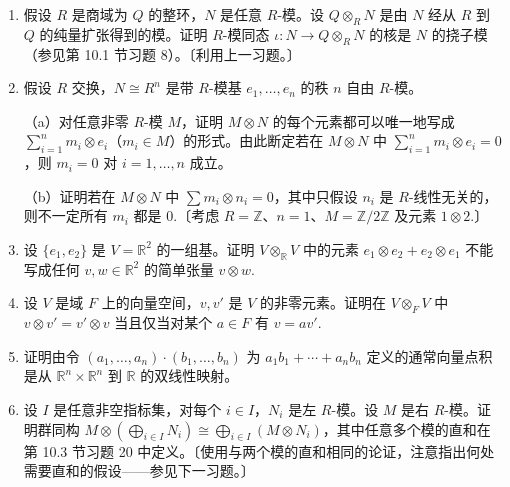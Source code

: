 \begin{enumerate}
（c）由（b）断定在 \(Q \otimes_R N\) 中 \((1/d) \otimes n = 0\) 当且仅当对某个非零 \(r \in R\) 有 \(rn = 0\).

（d）若 \(A\) 是阿贝尔群，证明 \(Q \otimes_{\mathbb{Z}} A = 0\) 当且仅当 \(A\) 是挠阿贝尔群（即 \(A\) 的每个元素都有有限阶）。

\item 假设 \(R\) 是商域为 \(Q\) 的整环，\(N\) 是任意 \(R\)-模。设 \(Q \otimes_R N\) 是由 \(N\) 经从 \(R\) 到 \(Q\) 的纯量扩张得到的模。证明 \(R\)-模同态 \(\iota : N \to Q \otimes_R N\) 的核是 \(N\) 的挠子模（参见第 10.1 节习题 8）。〔利用上一习题。〕

\item 假设 \(R\) 交换，\(N \cong R^n\) 是带 \(R\)-模基 \(e_1, \ldots, e_n\) 的秩 \(n\) 自由 \(R\)-模。

（a）对任意非零 \(R\)-模 \(M\)，证明 \(M \otimes N\) 的每个元素都可以唯一地写成 \(\sum_{i=1}^n m_i \otimes e_i\)（\(m_i \in M\)）的形式。由此断定若在 \(M \otimes N\) 中 \(\sum_{i=1}^n m_i \otimes e_i = 0\)，则 \(m_i = 0\) 对 \(i = 1, \ldots, n\) 成立。

（b）证明若在 \(M \otimes N\) 中 \(\sum m_i \otimes n_i = 0\)，其中只假设 \(n_i\) 是 \(R\)-线性无关的，则不一定所有 \(m_i\) 都是 0.〔考虑 \(R = \mathbb{Z}\)、\(n = 1\)、\(M = \mathbb{Z}/2\mathbb{Z}\) 及元素 \(1 \otimes 2\).〕

\item 设 \(\{e_1, e_2\}\) 是 \(V = \mathbb{R}^2\) 的一组基。证明 \(V \otimes_{\mathbb{R}} V\) 中的元素 \(e_1 \otimes e_2+e_2 \otimes e_1\) 不能写成任何 \(v, w \in \mathbb{R}^2\) 的简单张量 \(v \otimes w\).

\item 设 \(V\) 是域 \(F\) 上的向量空间，\(v, v'\) 是 \(V\) 的非零元素。证明在 \(V \otimes_F V\) 中 \(v \otimes v' = v' \otimes v\) 当且仅当对某个 \(a \in F\) 有 \(v = av'\).

\item 证明由令 \((a_1, \ldots, a_n) \cdot (b_1, \ldots, b_n)\) 为 \(a_1b_1+\cdots+a_nb_n\) 定义的通常向量点积是从 \(\mathbb{R}^n \times \mathbb{R}^n\) 到 \(\mathbb{R}\) 的双线性映射。

\item 设 \(I\) 是任意非空指标集，对每个 \(i \in I\)，\(N_i\) 是左 \(R\)-模。设 \(M\) 是右 \(R\)-模。证明群同构 \(M \otimes (\bigoplus_{i \in I} N_i) \cong \bigoplus_{i \in I}(M \otimes N_i)\)，其中任意多个模的直和在第 10.3 节习题 20 中定义。〔使用与两个模的直和相同的论证，注意指出何处需要直和的假设——参见下一习题。〕


\end{enumerate}
